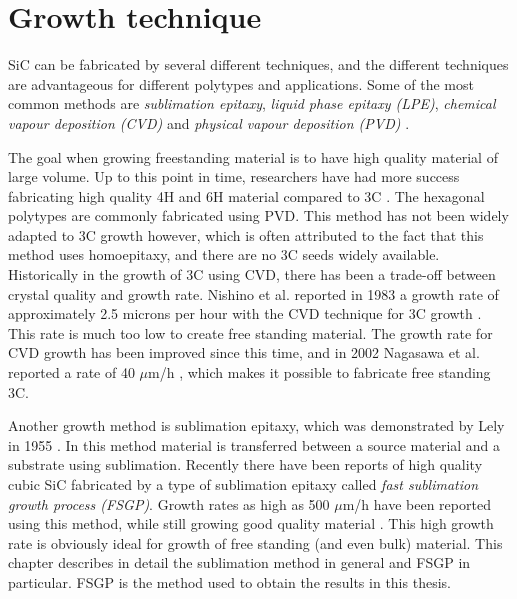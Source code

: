 \chapter{Growth technique}
\label{sec:growth}

	

SiC can be fabricated by several different techniques, and the different techniques are advantageous for different polytypes and applications. Some of the most common methods are \emph{sublimation epitaxy}, \emph{liquid phase epitaxy (LPE)}, \emph{chemical vapour deposition (CVD)} and \emph{physical vapour deposition (PVD)} \cite{Ivanov1999}. 

The goal when growing freestanding material is to have high quality material of large volume. Up to this point in time, researchers have had more success fabricating high quality 4H and 6H material compared to 3C \cite{J.B.CASADYandR.W.JOHNSON1996}. The hexagonal polytypes are commonly fabricated using PVD. This method has not been widely adapted to 3C growth however, which is often attributed to the fact that this method uses homoepitaxy, and there are no 3C seeds widely available. Historically in the growth of 3C using CVD, there has been a trade-off between crystal quality and growth rate. Nishino et al. reported in 1983 a growth rate of approximately 2.5 microns per hour with the CVD technique for 3C growth \cite{Nishino1983}. This rate is much too low to create free standing material. The growth rate for CVD growth has been improved since this time, and in 2002 Nagasawa et al. reported a rate of 40 $\mu$m/h \cite{Nagasawa2002}, which makes it possible to fabricate free standing 3C. 

Another growth method is sublimation epitaxy, which was demonstrated by Lely in 1955 \cite{Lely1955}. In this method material is transferred between a source material and a substrate using sublimation. Recently there have been reports of high quality cubic SiC fabricated by a type of sublimation epitaxy called \emph{fast sublimation growth process (FSGP)}. Growth rates as high as 500 $\mu$m/h have been reported using this method, while still growing good quality material \cite{Jokubavicius2014}. This high growth rate is obviously ideal for growth of free standing (and even bulk) material. This chapter describes in detail the sublimation method in general and FSGP in particular. FSGP is the method used to obtain the results in this thesis. 
 
